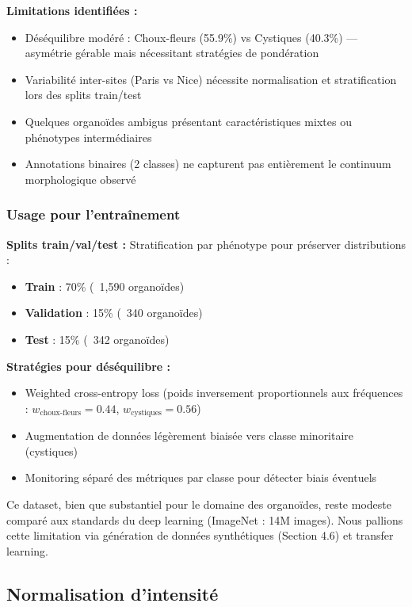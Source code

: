 \textbf{Limitations identifiées :}
\begin{itemize}
    \item Déséquilibre modéré : Choux-fleurs (55.9\%) vs Cystiques (40.3\%) — asymétrie gérable mais nécessitant stratégies de pondération
    \item Variabilité inter-sites (Paris vs Nice) nécessite normalisation et stratification lors des splits train/test
    \item Quelques organoïdes ambigus présentant caractéristiques mixtes ou phénotypes intermédiaires
    \item Annotations binaires (2 classes) ne capturent pas entièrement le continuum morphologique observé
\end{itemize}

\subsubsection{Usage pour l'entraînement}

\textbf{Splits train/val/test :}
Stratification par phénotype pour préserver distributions :
\begin{itemize}
    \item \textbf{Train} : 70\% (~1,590 organoïdes)
    \item \textbf{Validation} : 15\% (~340 organoïdes)
    \item \textbf{Test} : 15\% (~342 organoïdes)
\end{itemize}

\textbf{Stratégies pour déséquilibre :}
\begin{itemize}
    \item Weighted cross-entropy loss (poids inversement proportionnels aux fréquences : $w_{\text{choux-fleurs}} = 0.44$, $w_{\text{cystiques}} = 0.56$)
    \item Augmentation de données légèrement biaisée vers classe minoritaire (cystiques)
    \item Monitoring séparé des métriques par classe pour détecter biais éventuels
\end{itemize}

Ce dataset, bien que substantiel pour le domaine des organoïdes, reste modeste comparé aux standards du deep learning (ImageNet : 14M images). Nous pallions cette limitation via génération de données synthétiques (Section 4.6) et transfer learning.

\subsection{Normalisation d'intensité}

